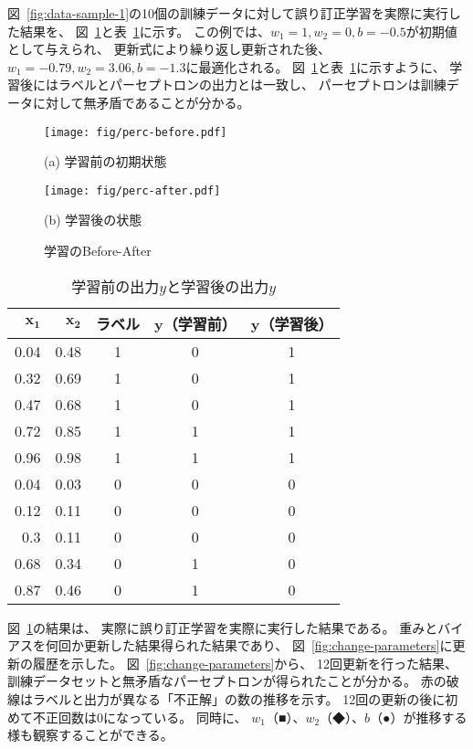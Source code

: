図~\ref{fig:data-sample-1}の10個の訓練データに対して誤り訂正学習を実際に実行した結果を、
図~\ref{fig:before-after}と表~\ref{tab:before-after}に示す。
この例では、$w_1 = 1, w_2 = 0, b = -0.5$が初期値として与えられ、
更新式により繰り返し更新された後、
$w_1 = -0.79, w_2 = 3.06, b = -1.3$に最適化される。
図~\ref{fig:before-after}と表~\ref{tab:before-after}に示すように、
学習後にはラベルとパーセプトロンの出力とは一致し、
パーセプトロンは訓練データに対して無矛盾であることが分かる。

\begin{figure}
  \centering
  \begin{minipage}{0.49\linewidth}\centering
    \texttt{[image: fig/perc-before.pdf]}

    (a) 学習前の初期状態
  \end{minipage}
  \begin{minipage}{0.49\linewidth}\centering
    \texttt{[image: fig/perc-after.pdf]}

    (b) 学習後の状態
  \end{minipage}
  \caption{学習のBefore-After}
  \label{fig:before-after}
\end{figure}

\begin{table}[htb]
  \centering
  \caption{学習前の出力$y$と学習後の出力$y$}
  \label{tab:before-after}
  
  \begin{tabular}{rrccc}
    \toprule
    $\boldsymbol{x_1}$ & \bf $\boldsymbol{x_2}$ & \bf ラベル & \bf $\boldsymbol y$（学習前） & \bf $\boldsymbol y$（学習後） \\\midrule
    0.04 & 0.48 & 1 & 0 & 1\\
    0.32 & 0.69 & 1 & 0 & 1\\
    0.47 & 0.68 & 1 & 0 & 1\\
    0.72 & 0.85 & 1 & 1 & 1\\
    0.96 & 0.98 & 1 & 1 & 1\\
    0.04 & 0.03 & 0 & 0 & 0\\
    0.12 & 0.11 & 0 & 0 & 0\\
    0.3 & 0.11 & 0 & 0 & 0\\
    0.68 & 0.34 & 0 & 1 & 0\\
    0.87 & 0.46 & 0 & 1 & 0\\
    \bottomrule
  \end{tabular}
\end{table}

図~\ref{fig:before-after}の結果は、
実際に誤り訂正学習を実際に実行した結果である。
重みとバイアスを何回か更新した結果得られた結果であり、
図~\ref{fig:change-parameters}に更新の履歴を示した。
図~\ref{fig:change-parameters}から、
12回更新を行った結果、訓練データセットと無矛盾なパーセプトロンが得られたことが分かる。
赤の破線はラベルと出力が異なる「不正解」の数の推移を示す。
12回の更新の後に初めて不正回数は0になっている。
同時に、
$w_1$（■）、$w_2$（◆）、$b$（●）が推移する様も観察することができる。

